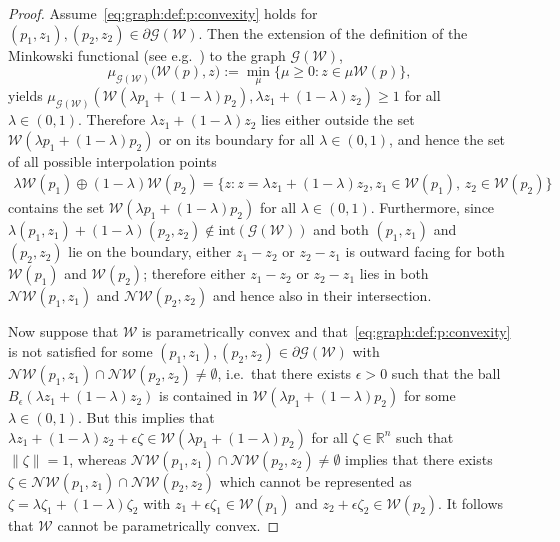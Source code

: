 \documentclass[a4paper, 12pt, twoside]{article}
\theoremstyle{definition}
\numberwithin{equation}{section}
\begin{document}
%
\begin{proof}
%
Assume~\eqref{eq:graph:def:p:convexity} holds for $(p_1,z_1),(p_2,z_2)\in\partial\mathscr G(\mathcal W)$.
%
Then the extension of the definition of the Minkowski functional (see e.g.~\cite{Rudin:91}) to the graph $\mathscr G(\mathcal W)$,
\[
\mu_{\mathscr G(\mathcal W)} \bigl(
\mathcal W(p), z \bigr)
:= \min_\mu \{\mu \geq 0 : z \in \mu \mathcal W(p)\},
\]
yields $\mu_{\mathscr G(\mathcal W)}\left(\mathcal W(\lambda p_1 + (1-\lambda)p_2),\lambda z_1+(1-\lambda)z_2\right)\geq1$ for all $\lambda\in(0,1)$. Therefore $\lambda z_1 + (1-\lambda) z_2$
lies either outside the set $\mathcal W(\lambda p_1+(1-\lambda)p_2)$ or on its boundary for all $\lambda\in(0,1)$, and hence the set of all possible interpolation points 
%
\[
\begin{split}
  \lambda \mathcal W(p_1)\oplus (1-\lambda)\mathcal W(p_2) = \{z : z=\lambda z_1 + (1-\lambda) z_2, z_1\in\mathcal  W(p_1),\, z_2\in\mathcal W(p_2)\}
\end{split}
\]
%
contains the set $\mathcal W(\lambda p_1 + (1-\lambda)p_2)$ for all $\lambda\in(0,1)$.
%
Furthermore, since $\lambda(p_1,z_1)+(1-\lambda)(p_2,z_2)\not\in \text{int}(\mathscr G(\mathcal W))$ and both $(p_1,z_1)$ and $(p_2,z_2)$ lie on the boundary, either $z_1-z_2$ or $z_2-z_1$ is outward facing for both $\mathcal W(p_1)$ and $\mathcal W(p_2)$; therefore either $z_1-z_2$ or $z_2-z_1$ lies in both $\mathcal N\mathcal W(p_1,z_1)$ and $\mathcal N\mathcal W(p_2,z_2)$ and hence also in their intersection.

Now suppose that $\mathcal W$ is parametrically convex and that~\eqref{eq:graph:def:p:convexity} is not satisfied for 
some $(p_1,z_1),(p_2,z_2)\in\partial\mathscr G(\mathcal W)$ with $\mathcal N\mathcal W(p_1,z_1)\cap\mathcal 
N\mathcal W(p_2,z_2)\neq\emptyset$, 
%
i.e.~that there exists $\epsilon>0$ such that the ball
$B_\epsilon(\lambda z_1 + (1-\lambda)z_2 )$
is contained in $\mathcal W(\lambda p_1 + (1-\lambda)p_2)$ for some $\lambda \in (0,1)$.
%
But this implies that $\lambda z_1 + (1-\lambda) z_2 + \epsilon\zeta \in \mathcal W(\lambda p_1+(1-\lambda)p_2)$  for all $\zeta\in\mathbb R^n$ such that $\|\zeta\| = 1$, whereas
$\mathcal N\mathcal W(p_1,z_1)\cap\mathcal N\mathcal W(p_2,z_2)\neq\emptyset$ implies that there exists 
$\zeta \in\mathcal N\mathcal W(p_1,z_1)\cap\mathcal N\mathcal W(p_2,z_2)$ which cannot be represented as
$\zeta =\lambda \zeta_1+
(1-\lambda)\zeta_2$
with $z_1 + \epsilon \zeta_1\in\mathcal W(p_1)$ and $z_2  + \epsilon \zeta_2\in\mathcal W(p_2)$.
%
It follows that $\mathcal W$ cannot be parametrically convex.
\end{proof}
%
\end{document}
